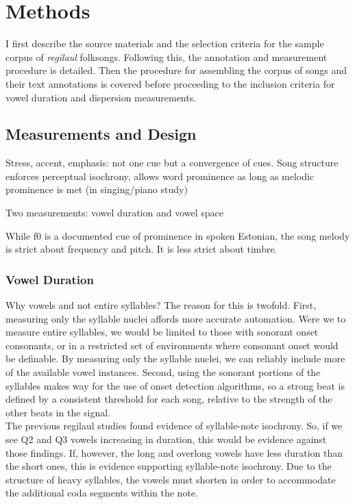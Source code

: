 \chapter{Methods}
%
I first describe the source materials and the selection criteria for the sample corpus of {\it regilaul} folksongs. Following this, the annotation and measurement procedure is detailed. Then the procedure for assembling the corpus of songs and their text annotations is covered before proceeding to the inclusion criteria for vowel duration and dispersion measurements.
\section{Measurements and Design}

Stress, accent, emphasis: not one cue but a convergence of cues. 
Song structure enforces perceptual isochrony, allows word prominence as long as melodic prominence is met (in singing/piano study) 

Two measurements: vowel duration and vowel space

While f0 is a documented cue of prominence in spoken Estonian, the song melody is strict about frequency and pitch. It is less strict about timbre. 
\subsection{Vowel Duration}
Why vowels and not entire syllables? The reason for this is twofold. First, measuring only the syllable nuclei affords more accurate automation. Were we to measure entire syllables, we would be limited to those with sonorant onset consonants, or in a restricted set of environments where consonant onset would be definable. By measuring only the syllable nuclei, we can reliably include more of the available vowel instances. Second, using the sonorant portions of the syllables makes way for the use of onset detection algorithms, so a strong beat is defined by a consistent threshold for each song, relative to the strength of the other beats in the signal. \\
The previous regilaul studies found evidence of syllable-note isochrony. So, if we see Q2 and Q3 vowels increasing in duration, this would be evidence against those findings. If, however, the long and overlong vowels have less duration than the short ones, this is evidence supporting syllable-note isochrony. Due to the structure of heavy syllables, the vowels must shorten in order to accommodate the additional coda segments within the note. 


